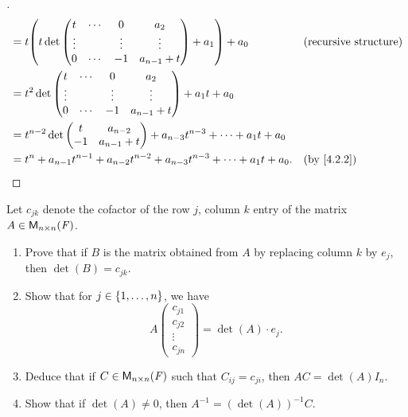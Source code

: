 \begin{proof}[]
\begin{align*}
     & = t \pa{t \det\begin{pmatrix}
                         t      & \cdots & 0      & a_2           \\
                         \vdots &        & \vdots & \vdots        \\
                         0      & \cdots & -1     & a_{n - 1} + t
                       \end{pmatrix} + a_1} + a_0                                                     &  & \text{(recursive structure)} \\
     & = t^2 \det\begin{pmatrix}
                   t      & \cdots & 0      & a_2           \\
                   \vdots &        & \vdots & \vdots        \\
                   0      & \cdots & -1     & a_{n - 1} + t
                 \end{pmatrix} + a_1 t + a_0                                                                             \\
     & = t^{n - 2} \det\begin{pmatrix}
                         t  & a_{n - 2}     \\
                         -1 & a_{n - 1} + t
                       \end{pmatrix} + a_{n - 3} t^{n - 3} + \cdots + a_1 t + a_0                                                     \\
     & = t^n + a_{n - 1} t^{n - 1} + a_{n - 2} t^{n - 2} + a_{n - 3} t^{n - 3} + \cdots + a_1 t + a_0. &  & \text{(by \cref{4.2.2})}
  \end{align*}
\end{proof}

\begin{ex}\label{ex:4.3.25}
  Let \(c_{j k}\) denote the cofactor of the row \(j\), column \(k\) entry of the matrix \(A \in \mathsf{M}_{{n} \times n}({\mathit{F}})\).
  \begin{enumerate}
    \item Prove that if \(B\) is the matrix obtained from \(A\) by replacing column \(k\) by \(e_j\), then \(\det(B) = c_{j k}\).
    \item Show that for \(j \in \left\lbrace1, \dots, n\right\rbrace\), we have
          \[
            A \begin{pmatrix}
              c_{j 1} \\
              c_{j 2} \\
              \vdots  \\
              c_{j n}
            \end{pmatrix} = \det(A) \cdot e_j.
          \]
    \item Deduce that if \(C \in \mathsf{M}_{{n} \times n}({\mathit{F}})\) such that \(C_{i j} = c_{j i}\), then \(AC = \det(A) I_n\).
    \item Show that if \(\det(A) \neq 0\), then \(A^{-1} = (\det(A))^{-1} C\).
  \end{enumerate}
\end{ex}


